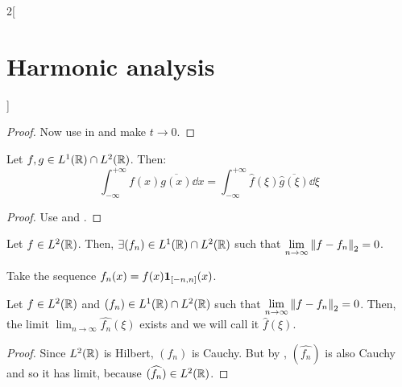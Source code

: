 \documentclass[../../../main_math.tex]{subfiles}
\begin{document}
\begin{multicols}{2}[\section{Harmonic analysis}]
\begin{proof}
    Now use  in  and make $t\to 0$.
  \end{proof}
  \begin{corollary}
    Let $f,g\in L^1(\mathbb{R})\cap L^2(\mathbb{R})$. Then:
    $$\int_{-\infty}^{+\infty}f(x)\overline{g(x)}\dd{x}=\int_{-\infty}^{+\infty}\widehat{f}(\xi)\overline{\widehat{g}(\xi)}\dd{\xi}$$
  \end{corollary}
  \begin{proof}
    Use  and .
  \end{proof}
  \begin{proposition}\label{HA:preDefFTinL2}
    Let $f\in L^2(\mathbb{R})$. Then, $\exists(f_n)\in L^1(\mathbb{R})\cap L^2(\mathbb{R})$ such that $\displaystyle\lim_{n\to\infty}\left\|f-f_n\right\|_2=0$.
  \end{proposition}
  \begin{sproof}
    Take the sequence $f_n(x)=f(x)\boldsymbol{\mathrm{1}}_{[-n,n]}(x)$.
  \end{sproof}
  \begin{proposition}
    Let $f\in L^2(\mathbb{R})$ and $(f_n)\in L^1(\mathbb{R})\cap L^2(\mathbb{R})$ such that $\displaystyle\lim_{n\to\infty}\left\|f-f_n\right\|_2=0$. Then, the limit $\displaystyle\lim_{n\to\infty}\widehat{f_n}(\xi)$ exists and we will call it $\widehat{f}(\xi)$.
  \end{proposition}
  \begin{proof}
    Since $L^2(\mathbb{R})$ is Hilbert, $(f_n)$ is Cauchy. But by , $(\widehat{f_n})$ is also Cauchy and so it has limit, because $(\widehat{f_n})\in L^2(\mathbb{R})$.


\end{proof}
\end{multicols}
\end{document}
